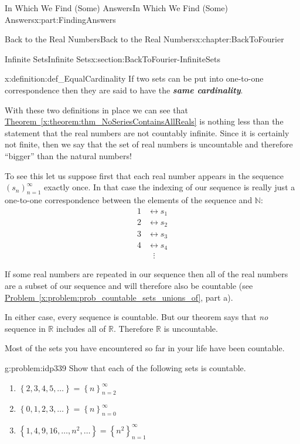 \documentclass[oneside,10pt,]{book}
\newcommand{\xreffont}{\relax}
\newcommand{\alert}[1]{\textbf{\textit{#1}}}
\numberwithin{equation}{section}
\newcommand{\RR}{\mathbb {R}}
\newcommand{\NN}{\mathbb {N}}
\newcommand{\amp}{&}
\begin{document}
\begin{partptx}{In Which We Find (Some) Answers}{}{In Which We Find (Some) Answers}{}{}{x:part:FindingAnswers}
\begin{chapterptx}{Back to the Real Numbers}{}{Back to the Real Numbers}{}{}{x:chapter:BackToFourier}
\begin{sectionptx}{Infinite Sets}{}{Infinite Sets}{}{}{x:section:BackToFourier-InfiniteSets}
\begin{definition}{}{x:definition:def_EqualCardinality}%
 If two sets can be put into one-to-one correspondence then they are said to have the \alert{same cardinality}.%
\end{definition}
With these two definitions in place we can see that \hyperref[x:theorem:thm_NoSeriesContainsAllReals]{Theorem~{\xreffont\ref{x:theorem:thm_NoSeriesContainsAllReals}}} is nothing less than the statement that the real numbers are not countably infinite. Since it is certainly not finite, then we say that the set of real numbers is uncountable and therefore ``bigger'' than the natural numbers!%
\par
To see this let us suppose first that each real number appears in the sequence \((s_n)_{n=1}^\infty\) exactly once. In that case the indexing of our sequence is really just a one-to-one correspondence between the elements of the sequence and \(\NN:\)%
\begin{align*}
1\amp \leftrightarrow s_1\\
2\amp \leftrightarrow s_2\\
3\amp \leftrightarrow s_3\\
4\amp \leftrightarrow s_4\\
\amp \ \ \ \vdots
\end{align*}
%
\par
If some real numbers are repeated in our sequence then all of the real numbers are a subset of our sequence and will therefore also be countable (see \hyperref[x:problem:prob_countable_sets_unions_of]{Problem~{\xreffont\ref{x:problem:prob_countable_sets_unions_of}}}, part a).%
\par
In either case, every sequence is countable. But our theorem says that \emph{no} sequence in \(\RR\) includes all of \(\RR\). Therefore \(\RR\) is uncountable.%
\par
Most of the sets you have encountered so far in your life have been countable.%
\begin{problem}{}{g:problem:idp339}%
Show that each of the following sets is countable.%
\begin{enumerate}[font=\bfseries,label=(\alph*),ref=\alph*]
\item{}\(\left\{2,3,4,5,\ldots\right\}=\left\{n\right\}_{n=2}^\infty\)%
\item{}\(\left\{0,1,2,3,\ldots\right\}=\left\{n\right\}_{n=0}^\infty\)%
\item{}\(\left\{1,4,9,16,\ldots,n^2,\ldots\right\}=\left\{n^2\right\}_{n=1}^\infty\)%

\end{enumerate}
\end{problem}
\end{sectionptx}
\end{chapterptx}
\end{partptx}
\end{document}
